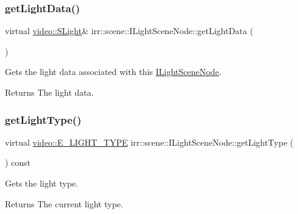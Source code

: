\subsubsection{\texorpdfstring{get\+Light\+Data()}{getLightData()}\hspace{0.1cm}{\footnotesize\ttfamily [2/2]}}
{\footnotesize\ttfamily virtual \hyperlink{structirr_1_1video_1_1SLight}{video\+::\+S\+Light}\& irr\+::scene\+::\+I\+Light\+Scene\+Node\+::get\+Light\+Data (\begin{DoxyParamCaption}{ }\end{DoxyParamCaption})\hspace{0.3cm}{\ttfamily [pure virtual]}}



Gets the light data associated with this \hyperlink{classirr_1_1scene_1_1ILightSceneNode}{I\+Light\+Scene\+Node}. 

\begin{DoxyReturn}{Returns}
The light data. 
\end{DoxyReturn}
\mbox{\label{classirr_1_1scene_1_1ILightSceneNode_a47e327388c75391ebc910369af7eedce}} 
\subsubsection{\texorpdfstring{get\+Light\+Type()}{getLightType()}}
{\footnotesize\ttfamily virtual \hyperlink{namespaceirr_1_1video_aaf0e02f6f83cc35cf9e764bf18400d39}{video\+::\+E\+\_\+\+L\+I\+G\+H\+T\+\_\+\+T\+Y\+PE} irr\+::scene\+::\+I\+Light\+Scene\+Node\+::get\+Light\+Type (\begin{DoxyParamCaption}{ }\end{DoxyParamCaption}) const\hspace{0.3cm}{\ttfamily [pure virtual]}}



Gets the light type. 

\begin{DoxyReturn}{Returns}
The current light type. 
\end{DoxyReturn}
\mbox{\label{classirr_1_1scene_1_1ILightSceneNode_a4ce3cd789ed3adabd381ff7f915861a0}} 
